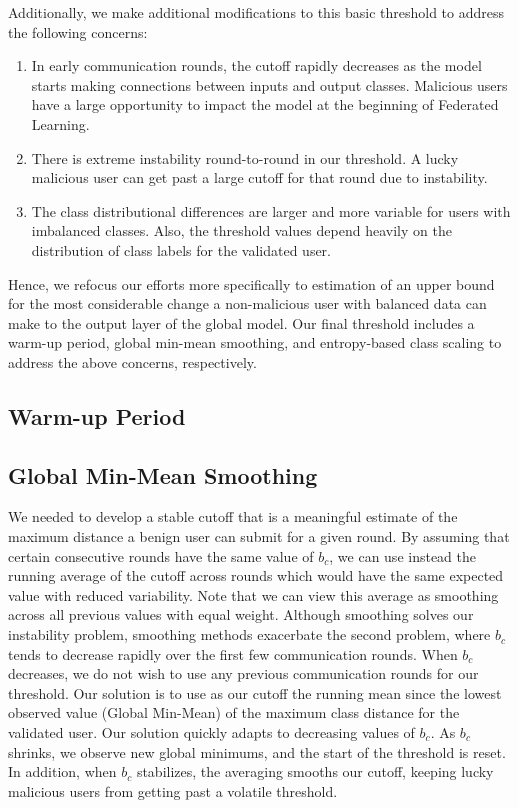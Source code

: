 \documentclass{article} %
\begin{document}
Additionally, we make additional modifications to this basic threshold to address the following concerns:
\begin{enumerate}
    \item In early communication rounds, the cutoff rapidly decreases as the model starts making connections between inputs and output classes. Malicious users have a large opportunity to impact the model at the beginning of Federated Learning.
    \item There is extreme instability round-to-round in our threshold. A lucky malicious user can get past a large cutoff for that round due to instability.
    \item The class distributional differences are larger and more variable for users with imbalanced classes. Also, the threshold values depend heavily on the distribution of class labels for the validated user.
\end{enumerate}

Hence, we refocus our efforts more specifically to estimation of an upper bound for the most considerable change a non-malicious user with balanced data can make to the output
layer of the global model. Our final threshold includes a warm-up period, global min-mean smoothing, and entropy-based class scaling to address the above concerns, respectively.

%
\subsection{Warm-up Period}


%
\subsection{Global Min-Mean Smoothing}

We needed to develop a stable cutoff that is a meaningful estimate of the maximum distance a benign user can submit for a given round. By assuming that certain consecutive rounds have the same value of $b_c$, we can use instead the running average of the cutoff across rounds which would have the same expected value with reduced variability. Note that we can view this average as smoothing across all previous values with equal weight. Although smoothing solves our instability problem, smoothing methods exacerbate the second problem, where $b_c$ tends to decrease rapidly over the first few communication rounds. When $b_c$ decreases, we do not wish to use any previous communication rounds for our threshold. Our solution is to use as our cutoff the running mean since the lowest observed value (Global Min-Mean) of the maximum class distance for the validated user. Our solution quickly adapts to decreasing values of $b_c$. As $b_c$ shrinks, we observe new global minimums, and the start of the threshold is reset. In addition, when $b_c$ stabilizes, the averaging smooths our cutoff, keeping lucky malicious users from getting past a volatile threshold.
\end{document}
